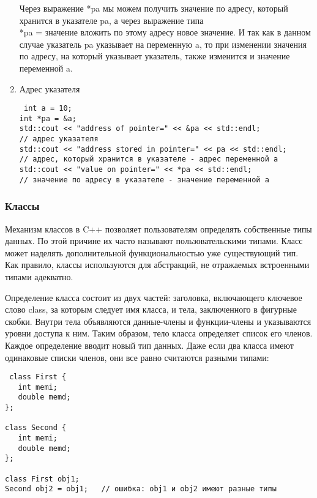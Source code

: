\documentclass[a4paper,report,14pt]{ncc}
\begin{document}
\begin{enumerate}
Через выражение *pa мы можем получить значение по адресу, который хранится в указателе pa, а через выражение типа \\ *pa = значение вложить по этому адресу новое значение. 
И так как в данном случае указатель pa указывает на переменную a, то при изменении значения по адресу, на который указывает указатель, также изменится и значение переменной a.

\item Адрес указателя

\begin{verbatim}
 int a = 10;
int *pa = &a;
std::cout << "address of pointer=" << &pa << std::endl;
// адрес указателя
std::cout << "address stored in pointer=" << pa << std::endl;
// адрес, который хранится в указателе - адрес переменной a         
std::cout << "value on pointer=" << *pa << std::endl;
// значение по адресу в указателе - значение переменной a

\end{verbatim}


\end{enumerate}



\subsubsection{Классы}

Механизм классов в C++ позволяет пользователям определять собственные типы данных. По этой причине их часто называют пользовательскими типами. Класс может наделять дополнительной функциональностью уже существующий тип. Как правило, классы используются для абстракций, не отражаемых встроенными типами адекватно.

Определение класса состоит из двух частей: заголовка, включающего ключевое слово class, за которым следует имя класса, и тела, заключенного в фигурные скобки. Внутри тела объявляются данные-члены и функции-члены и указываются уровни доступа к ним. Таким образом, тело класса определяет список его членов.
Каждое определение вводит новый тип данных. Даже если два класса имеют одинаковые списки членов, они все равно считаются разными типами:

\begin{verbatim}
 class First {
   int memi;
   double memd;
};

class Second {
   int memi;
   double memd;
};

class First obj1;
Second obj2 = obj1;   // ошибка: obj1 и obj2 имеют разные типы
\end{verbatim}
\end{document}
